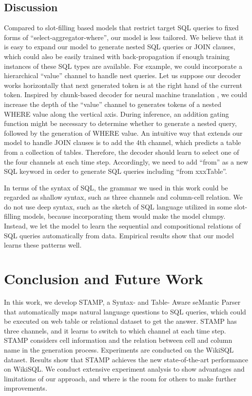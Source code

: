 \documentclass[11pt,a4paper]{article}
\begin{document}
\subsection{Discussion}
Compared to slot-filling based models that restrict target SQL queries to fixed forms of ``select-aggregator-where'', our model is less tailored. We believe that it is easy to expand our model to generate nested SQL queries or JOIN clauses, which could also be easily trained with back-propagation if enough training instances of these SQL types are available.  For example, we could incorporate a hierarchical ``value'' channel to handle nest queries. Let us suppose our decoder works horizontally that next generated token is at the right hand of the current token. Inspired by chunk-based decoder for neural machine translation \cite{ishiwatari-EtAl:2017:Long}, we could increase the depth of the ``value'' channel to generates tokens of a nested WHERE value along the vertical axis. During inference, an addition gating function might be necessary to determine whether to generate a nested query, followed by the generation of WHERE value. 
An intuitive way that extends our model to handle JOIN clauses is to add the 4th channel, which predicts a table from a collection of tables. Therefore, the decoder should learn to select one of the four channels at each time step. Accordingly, we need to add ``from'' as a new SQL keyword in order to generate SQL queries including ``from xxxTable''.

In terms of the syntax of SQL, the grammar we used in this work could be regarded as shallow syntax, such as three channels and column-cell relation. We do not use deep syntax, such as the sketch of SQL language utilized in some slot-filling models, because incorporating them would make the model clumpy. Instead, we let the model to learn the sequential and compositional relations of SQL queries automatically from data. Empirical results show that our model learns these patterns well.


\section{Conclusion and Future Work}
In this work, we develop STAMP, a Syntax- and Table- Aware seMantic Parser that automatically maps natural language questions to SQL queries, which could be executed on web table or relational dataset to get the answer.
STAMP has three channels, and it \mbox{learns} to switch to which channel at each time step.
\mbox{STAMP} considers cell information and the relation between cell and column name in the generation process.
Experiments are conducted on the WikiSQL dataset. Results show that STAMP achieves the new state-of-the-art performance on WikiSQL.
We conduct extensive experiment analysis to show
advantages and limitations of our approach, and where is the room for others to make further improvements.
\end{document}
